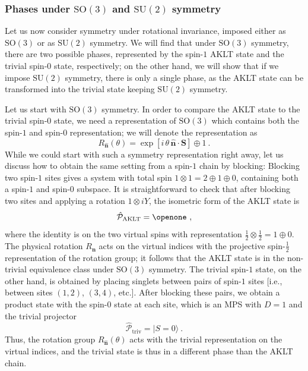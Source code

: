 \documentclass[twocolumn,superscriptaddress,prb,linenumbers]{revtex4-1}
\newcommand{\ket}[1]{\vert#1\rangle}
\newcommand{\mc}[1]{\mathcal{#1}}
\begin{document}
\subsubsection{Phases under $\mathrm{SO}(3)$ and
    $\mathrm{SU}(2)$ symmetry}

Let us now consider symmetry under rotational invariance, imposed either
as $\mathrm{SO}(3)$ or as $\mathrm{SU(2)}$ symmetry. We will find that
under $\mathrm{SO}(3)$ symmetry, there are two possible phases,
represented by the spin-$1$ AKLT state and the trivial spin-$0$ state,
respectively; on the other hand, we will show that if we impose
$\mathrm{SU}(2)$ symmetry, there is only a single phase, as the AKLT state
can be transformed into the trivial state keeping $\mathrm{SU}(2)$
symmetry.


Let us start with $\mathrm{SO}(3)$ symmetry. In order to compare the
AKLT state to the trivial spin-$0$ state, we need a representation of
$\mathrm{SO}(3)$ which contains both the spin-$1$ and spin-$0$
representation; we will denote the representation as
\[
    R_{\hat{\bm n}}(\theta) = \exp[i\, \theta\, \hat{\bm n}\cdot \bm S]\oplus 1\ .
\]
While we could start with such a symmetry representation right away, let
us discuss how to obtain the same setting from a spin-$1$ chain by
blocking: Blocking two
spin-$1$ sites gives a system with total spin $1\otimes 1=2\oplus 1 \oplus
    0$, containing both a spin-$1$ and spin-$0$ subspace. It is
straightforward to check that after blocking two sites and applying a
rotation $1\otimes iY$, the isometric form of the AKLT state is
\begin{equation}
    \label{eq:ex:aklt-iso-proj}
    \hat{\mc P}_{\mathrm{AKLT}} = \openone\ ,
\end{equation}
where the identity is on the two virtual spins with representation
$\tfrac12\otimes \tfrac12 = 1\oplus 0$.  The physical
rotation $R_{\hat{\bm n}}$
acts on the virtual indices with the
projective spin-$\tfrac12$ representation of the rotation group; it
follows that the AKLT state is in the non-trivial equivalence class under
$\mathrm{SO}(3)$ symmetry.  The trivial spin-$1$ state, on the other hand,
is obtained by placing singlets between pairs of spin-$1$ sites [i.e.,
        between sites
        $(1,2)$, $(3,4)$, etc.]. After blocking these pairs, we obtain a product
state with the spin-$0$ state at each site, which is an MPS with $D=1$
and the trivial projector
\begin{equation}
    \label{eq:ex:trivialstate-iso-proj}
    \hat{\mc P}_{\mathrm{triv}} = \ket{S=0}\ .
\end{equation}
Thus, the rotation group $R_{\hat{\bm n}}(\theta)$ acts with the trivial
representation on the virtual indices, and the trivial state is thus in a
different phase than the AKLT chain.
\end{document}
